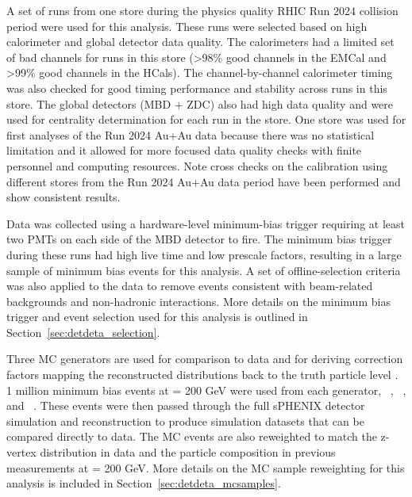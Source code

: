 A set of runs from one store during the physics quality RHIC Run 2024 \auau collision period were used for this analysis. 
These runs were selected based on high calorimeter and global detector data quality.
The calorimeters had a limited set of bad channels for runs in this store (>98\% good channels in the EMCal and >99\% good channels in the HCals).
The channel-by-channel calorimeter timing was also checked for good timing performance and stability across runs in this store.
The global detectors (MBD + ZDC) also had high data quality and were used for centrality determination for each run in the store. 
One store was used for first analyses of the Run 2024 Au+Au data because there was no statistical limitation and it allowed for more focused data quality checks with finite personnel and computing resources. 
Note cross checks on the calibration using different stores from the Run 2024 Au+Au data period have been performed and show consistent results. 

Data was collected using a hardware-level minimum-bias trigger requiring at least two PMTs on each side of the MBD detector to fire.
The minimum bias trigger during these runs had high live time and low prescale factors, resulting in a large sample of minimum bias events for this analysis.
A set of offline-selection criteria was also applied to the data to remove events consistent with beam-related backgrounds and non-hadronic interactions.
More details on the minimum bias trigger and event selection used for this analysis is outlined in Section~\ref{sec:detdeta_selection}.

Three MC generators are used for comparison to data and for deriving correction factors mapping the reconstructed \detdeta distributions back to the truth particle level \detdeta. 
1 million minimum bias \auau events at \snn = 200 GeV were used from each generator, \hijing~\cite{hijing}, \ampt~\cite{ampt}, and \epos~\cite{epos}.
These events were then passed through the full sPHENIX detector \geant~\cite{GEANT4} simulation and reconstruction to produce simulation datasets that can be compared directly to data.
The MC events are also reweighted to match the z-vertex distribution in data and the particle composition in previous \auau measurements at \snn = 200 GeV. 
More details on the MC sample reweighting for this analysis is included in Section~\ref{sec:detdeta_mcsamples}.